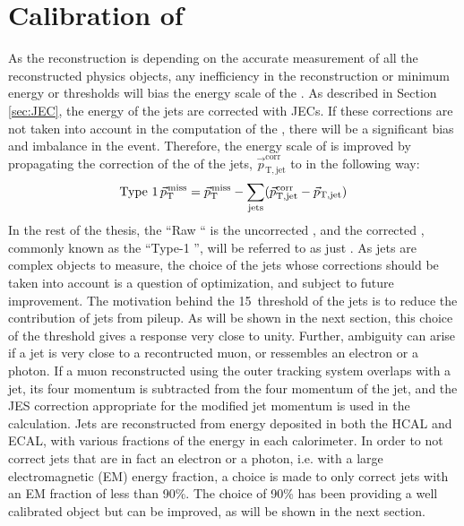 \section{Calibration of \ptmiss} 
\label{sec:metcorrections}
As the \ptmiss reconstruction is depending on the accurate measurement of all the reconstructed physics objects, any inefficiency in the reconstruction or minimum energy or \pt thresholds will bias the energy scale of the \ptmiss. 
As described in Section \ref{sec:JEC}, the energy of the jets are corrected with JECs. 
If these corrections are not taken into account in the computation of the \ptmiss, there will be a significant bias and imbalance in the event. 
Therefore, the energy scale of \ptmiss is improved by propagating the correction of the \pt of the jets, $\vec{p}_\mathrm{T,jet}^\mathrm{corr}$ to \ptmiss in the following way:
\begin{equation}
\text{Type 1} \, {\vec p}_{\mathrm{T}}^{\kern1pt\text{miss}}
={\vec p}_{\mathrm{T}}^{\kern1pt\text{miss}} - \sum_\mathrm{jets} (\vec{p}_\mathrm{T,jet}^\mathrm{corr}-\vec{p}_\mathrm{T,jet})
\label{eq:Type1MET}
\end{equation}                                                                          
In the rest of the thesis, the ``Raw \ptmiss`` is the uncorrected \ptmiss, and the corrected \ptmiss, commonly known as the ``Type-1 \ptmiss'', will be referred to as just \ptmiss.
As jets are complex objects to measure, the choice of the jets whose corrections should be taken into account is a question of optimization, and subject to future improvement. 
The motivation behind the 15~\GeV \pt threshold of the jets is to reduce the contribution of jets from pileup. 
As will be shown in the next section, this choice of the \pt threshold gives a response very close to unity. 
Further, ambiguity can arise if a jet is very close to a recontructed muon, or ressembles an electron or a photon. 
If a muon reconstructed using the outer tracking system overlaps with a jet, its four momentum is subtracted from the four momentum of the jet, and the JES correction appropriate for the modified jet momentum is used in the \ptmiss calculation. 
Jets are reconstructed from energy deposited in both the HCAL and ECAL, with various fractions of the energy in each calorimeter. 
In order to not correct jets that are in fact an electron or a photon, i.e. with a large electromagnetic (EM) energy fraction, a choice is made to only correct jets with an EM fraction of less than 90\%. 
The choice of 90\% has been providing a well calibrated \ptmiss object but can be improved, as will be shown in the next section.  
